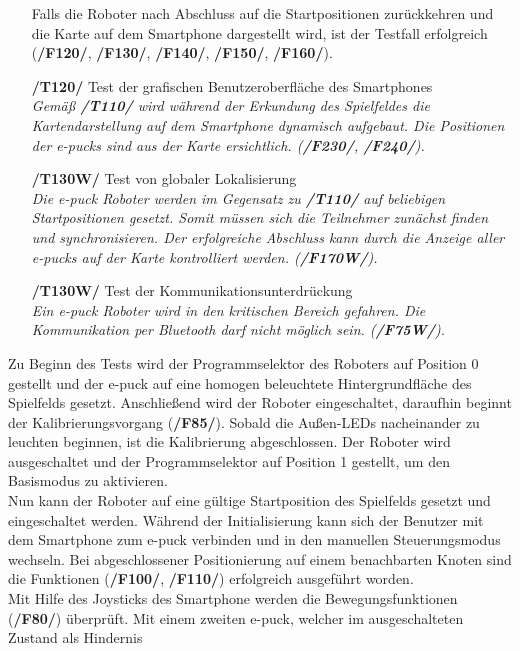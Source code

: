 \documentclass[10pt,a4paper]{article}
\begin{document}
\begin{itemize}
{						Falls die Roboter nach Abschluss auf die Startpositionen zurückkehren und die Karte auf dem Smartphone dargestellt
						wird, ist der Testfall erfolgreich (\textbf{/F120/}, \textbf{/F130/}, \textbf{/F140/}, \textbf{/F150/}, \textbf{/F160/}).}
				\item[\textbf{/T120/}] Test der grafischen Benutzeroberfläche des Smartphones
					\\ \textsl{Gemäß \textbf{/T110/} wird während der Erkundung des Spielfeldes die Kartendarstellung auf dem Smartphone
						dynamisch aufgebaut. Die Positionen der e-pucks sind aus der Karte ersichtlich.  (\textbf{/F230/}, \textbf{/F240/}).}
				\item[\textbf{/T130W/}] Test von globaler Lokalisierung
					\\ \textsl{Die e-puck Roboter werden im Gegensatz zu \textbf{/T110/} auf beliebigen Startpositionen gesetzt. Somit müssen
						sich die Teilnehmer zunächst finden und synchronisieren. Der erfolgreiche Abschluss kann durch die Anzeige aller e-pucks
						auf der Karte kontrolliert werden. (\textbf{/F170W/}).}
				\item[\textbf{/T130W/}] Test der Kommunikationsunterdrückung
					\\ \textsl{Ein e-puck Roboter wird in den kritischen Bereich gefahren. Die Kommunikation per Bluetooth darf nicht möglich
						sein.  (\textbf{/F75W/}).}																		
			\end{itemize} 
				Zu Beginn des Tests wird der Programmselektor des Roboters auf Position 0 gestellt und der e-puck auf eine homogen
				beleuchtete Hintergrundfläche des Spielfelds gesetzt. Anschließend wird der Roboter eingeschaltet, daraufhin beginnt der
				Kalibrierungsvorgang (\textbf{/F85/}). Sobald die Außen-LEDs nacheinander zu leuchten beginnen, ist die Kalibrierung
				abgeschlossen. Der Roboter wird ausgeschaltet und der Programmselektor auf Position 1 gestellt, um den Basismodus zu
				aktivieren. \\
				Nun kann der Roboter auf eine gültige Startposition des	Spielfelds gesetzt und eingeschaltet werden. Während der Initialisierung
				kann	sich der Benutzer mit dem Smartphone zum e-puck verbinden und in den manuellen Steuerungsmodus wechseln. Bei
				abgeschlossener Positionierung auf einem benachbarten Knoten sind die Funktionen (\textbf{/F100/}, \textbf{/F110/}) erfolgreich
				ausgeführt worden. \\ 
				Mit Hilfe des Joysticks des Smartphone werden die Bewegungsfunktionen (\textbf{/F80/}) überprüft. Mit einem zweiten e-puck,
				welcher im ausgeschalteten Zustand als Hindernis
							
\end{document}
